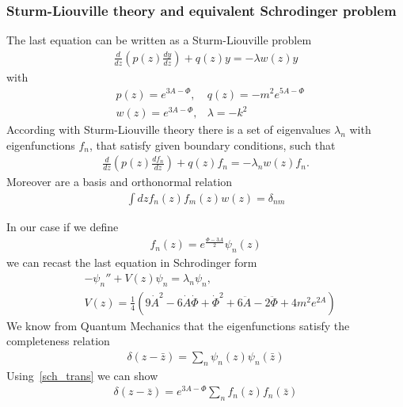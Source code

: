 \documentclass[12pt,a4paper]{article}
\begin{document}
\subsubsection{Sturm-Liouville theory and equivalent Schrodinger problem}

The last equation can be written as a Sturm-Liouville problem
\begin{align}
    \frac{d}{dz}\left( p\left(z\right) \frac{d y}{dz} \right) + q\left(z\right) y = - \lambda w\left(z\right) y
\end{align}
with
\begin{align}
    & p\left(z\right) =  e^{3 A - \Phi}, & q\left(z\right) =  -m^2  e^{5 A - \Phi} \\
    & w\left(z\right) = e^{3 A - \Phi}, & \lambda = - k^2
\end{align}
According with Sturm-Liouville theory there is a set of eigenvalues $\lambda_n$ with eigenfunctions $f_n$, that satisfy given boundary conditions, such that
\begin{align}
    \label{eq_eigenfunction}
    \frac{d}{dz}\left( p\left(z\right) \frac{d f_n}{dz} \right) + q\left(z\right) f_n = - \lambda_n w\left(z\right) f_n.
\end{align}
Moreover are a basis and orthonormal relation
\begin{align}
    \int d z f_n\left(z\right) f_m \left( z \right) w \left(z\right) = \delta_{n m}
\end{align}

In our case if we define
\begin{align}
    \label{sch_trans}
    f_n\left(z\right) = e^{\frac{\Phi - 3 A}{2}} \psi_n \left(z\right)
\end{align}
we can recast the last equation in Schrodinger form
\begin{align}
    & -\psi_n'' + V\left(z\right) \psi_n =  \lambda_n \psi_n, \\
    & V\left( z \right) = \frac{1}{4} \left( 9 \dot{A}^2 - 6 \dot{A} \dot{\Phi} + \dot{\Phi}^2 + 6 \ddot{A} - 2 \ddot{\Phi} + 4 m^2 e^{2A}\right)
\end{align}
We know from Quantum Mechanics that the eigenfunctions satisfy the completeness relation
\begin{align}
    \delta \left( z - \bar{z} \right) = \sum_n \psi_n \left(z\right) \psi_n \left(\bar{z}\right) 
\end{align}
Using~\ref{sch_trans} we can show
\begin{align}
    \label{delta_eigen_decomp}
    \delta \left( z - \bar{z} \right) = e^{3 A - \Phi} \sum_n f_n \left(z \right) f_n\left(\bar{z}\right)
\end{align}
\end{document}
